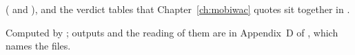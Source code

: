 \begin{description}
        ( and ), and the verdict
        tables that Chapter~\ref{ch:mobiwac} quotes sit together in
        .
  \item[The label-history benchmark.] Computed by
        ; outputs and the reading
        of them are in Appendix~D of \extravolume, which names the files.
\end{description}

